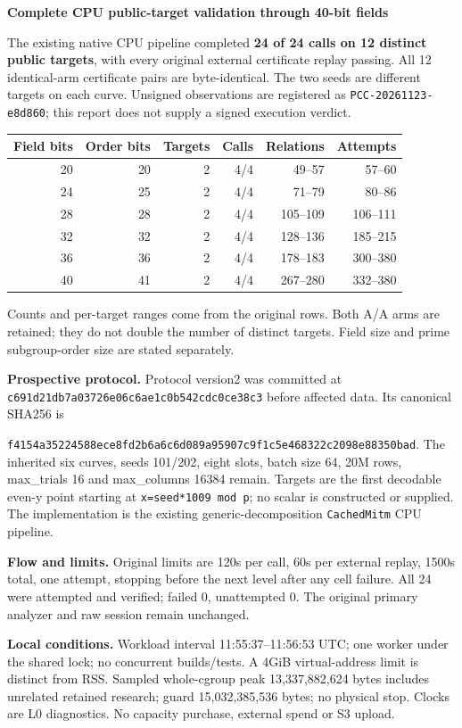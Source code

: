\documentclass[10pt]{article}
\begin{document}
{\Large\bfseries Complete CPU public-target validation through 40-bit fields}

The existing native CPU pipeline completed \textbf{24 of 24 calls on 12 distinct
public targets}, with every original external certificate replay passing.
All 12 identical-arm certificate pairs are byte-identical. The two seeds are
different targets on each curve. Unsigned observations are registered as
\texttt{PCC-20261123-e8d860}; this report does not supply a signed execution verdict.

\begin{center}
\begin{tabular}{@{}rrrrrr@{}}\toprule
Field bits & Order bits & Targets & Calls & Relations & Attempts\\\midrule
20&20&2&4/4&49--57&57--60\\
24&25&2&4/4&71--79&80--86\\
28&28&2&4/4&105--109&106--111\\
32&32&2&4/4&128--136&185--215\\
36&36&2&4/4&178--183&300--380\\
40&41&2&4/4&267--280&332--380\\\bottomrule
\end{tabular}
\end{center}
Counts and per-target ranges come from the original rows. Both A/A arms are
retained; they do not double the number of distinct targets. Field size and
prime subgroup-order size are stated separately.

\textbf{Prospective protocol.} Protocol version2 was committed at
\texttt{c691d21db7a03726e06c6ae1c0b542cdc0ce38c3} before affected data.
Its canonical SHA256 is\par
{\footnotesize\texttt{f4154a35224588ece8fd2b6a6c6d089a95907c9f1c5e468322c2098e88350bad}.}
The inherited six curves, seeds 101/202, eight slots, batch size 64, 20M rows,
max\_trials 16 and max\_columns 16384 remain. Targets are the first decodable
even-y point starting at \texttt{x=seed*1009 mod p}; no scalar is constructed
or supplied. The implementation is the existing generic-decomposition
\texttt{CachedMitm} CPU pipeline.

\textbf{Flow and limits.} Original limits are 120s per call, 60s per external
replay, 1500s total, one attempt, stopping before the next level after any cell
failure. All 24 were attempted and verified; failed 0, unattempted 0. The original
primary analyzer and raw session remain unchanged.

\textbf{Local conditions.} Workload interval 11:55:37--11:56:53 UTC; one worker
under the shared lock; no concurrent builds/tests. A 4GiB virtual-address limit
is distinct from RSS. Sampled whole-cgroup peak 13,337,882,624 bytes includes
unrelated retained research; guard 15,032,385,536 bytes; no physical stop.
Clocks are L0 diagnostics. No capacity purchase, external spend or S3 upload.
\end{document}
